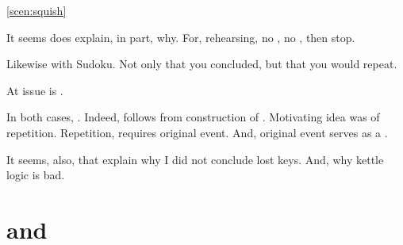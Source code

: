 \begin{note}
  \autoref{scen:squish}

  It seems does explain, in part, why.
  For, rehearsing, no \ros{}, no \fc{}, then stop.

  Likewise with Sudoku.
  Not only that you concluded, but that you would repeat.

  At issue is \sRAdj{}.
\end{note}

\begin{note}
  In both cases, \wit{}.
  Indeed, \wit{} follows from construction of .
  Motivating idea was of repetition.
  Repetition, requires original event.
  And, original event serves as a \wit{}.
\end{note}

\begin{note}
  It seems, also, that explain why I did not conclude lost keys.
  And, why kettle logic is bad.
\end{note}


\section{ and \issueConstraint{}}
\label{cha:binding:sec:requ-iC}


